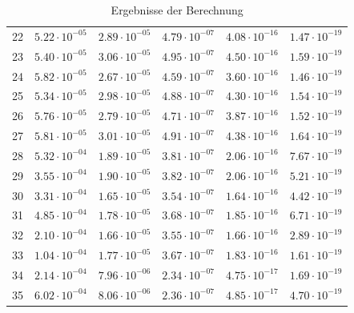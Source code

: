 \begin{table}[h]
\begin{tabular}{llllll}
		22 &$\mathrm{5.22 \cdot 10^{-05}}$ & $\mathrm{2.89 \cdot 10^{-05}}$ & $\mathrm{4.79 \cdot 10^{-07}}$ & $\mathrm{4.08 \cdot 10^{-16}}$ & $\mathrm{1.47 \cdot 10^{-19}}$ \\
		23 &$\mathrm{5.40 \cdot 10^{-05}}$ & $\mathrm{3.06 \cdot 10^{-05}}$ & $\mathrm{4.95 \cdot 10^{-07}}$ & $\mathrm{4.50 \cdot 10^{-16}}$ & $\mathrm{1.59 \cdot 10^{-19}}$ \\
		24 &$\mathrm{5.82 \cdot 10^{-05}}$ & $\mathrm{2.67 \cdot 10^{-05}}$ & $\mathrm{4.59 \cdot 10^{-07}}$ & $\mathrm{3.60 \cdot 10^{-16}}$ & $\mathrm{1.46 \cdot 10^{-19}}$ \\
		25 &$\mathrm{5.34 \cdot 10^{-05}}$ & $\mathrm{2.98 \cdot 10^{-05}}$ & $\mathrm{4.88 \cdot 10^{-07}}$ & $\mathrm{4.30 \cdot 10^{-16}}$ & $\mathrm{1.54 \cdot 10^{-19}}$ \\
		26 &$\mathrm{5.76 \cdot 10^{-05}}$ & $\mathrm{2.79 \cdot 10^{-05}}$ & $\mathrm{4.71 \cdot 10^{-07}}$ & $\mathrm{3.87 \cdot 10^{-16}}$ & $\mathrm{1.52 \cdot 10^{-19}}$ \\
		27 &$\mathrm{5.81 \cdot 10^{-05}}$ & $\mathrm{3.01 \cdot 10^{-05}}$ & $\mathrm{4.91 \cdot 10^{-07}}$ & $\mathrm{4.38 \cdot 10^{-16}}$ & $\mathrm{1.64 \cdot 10^{-19}}$ \\
		28 &$\mathrm{5.32 \cdot 10^{-04}}$ & $\mathrm{1.89 \cdot 10^{-05}}$ & $\mathrm{3.81 \cdot 10^{-07}}$ & $\mathrm{2.06 \cdot 10^{-16}}$ & $\mathrm{7.67 \cdot 10^{-19}}$ \\
		29 &$\mathrm{3.55 \cdot 10^{-04}}$ & $\mathrm{1.90 \cdot 10^{-05}}$ & $\mathrm{3.82 \cdot 10^{-07}}$ & $\mathrm{2.06 \cdot 10^{-16}}$ & $\mathrm{5.21 \cdot 10^{-19}}$ \\
		30 &$\mathrm{3.31 \cdot 10^{-04}}$ & $\mathrm{1.65 \cdot 10^{-05}}$ & $\mathrm{3.54 \cdot 10^{-07}}$ & $\mathrm{1.64 \cdot 10^{-16}}$ & $\mathrm{4.42 \cdot 10^{-19}}$ \\
		31 &$\mathrm{4.85 \cdot 10^{-04}}$ & $\mathrm{1.78 \cdot 10^{-05}}$ & $\mathrm{3.68 \cdot 10^{-07}}$ & $\mathrm{1.85 \cdot 10^{-16}}$ & $\mathrm{6.71 \cdot 10^{-19}}$ \\
		32 &$\mathrm{2.10 \cdot 10^{-04}}$ & $\mathrm{1.66 \cdot 10^{-05}}$ & $\mathrm{3.55 \cdot 10^{-07}}$ & $\mathrm{1.66 \cdot 10^{-16}}$ & $\mathrm{2.89 \cdot 10^{-19}}$ \\
		33 &$\mathrm{1.04 \cdot 10^{-04}}$ & $\mathrm{1.77 \cdot 10^{-05}}$ & $\mathrm{3.67 \cdot 10^{-07}}$ & $\mathrm{1.83 \cdot 10^{-16}}$ & $\mathrm{1.61 \cdot 10^{-19}}$ \\
		34 &$\mathrm{2.14 \cdot 10^{-04}}$ & $\mathrm{7.96 \cdot 10^{-06}}$ & $\mathrm{2.34 \cdot 10^{-07}}$ & $\mathrm{4.75 \cdot 10^{-17}}$ & $\mathrm{1.69 \cdot 10^{-19}}$ \\
		35 &$\mathrm{6.02 \cdot 10^{-04}}$ & $\mathrm{8.06 \cdot 10^{-06}}$ & $\mathrm{2.36 \cdot 10^{-07}}$ & $\mathrm{4.85 \cdot 10^{-17}}$ & $\mathrm{4.70 \cdot 10^{-19}}$ \\
		\bottomrule
	\end{tabular}
	\caption{Ergebnisse der Berechnung}
	\label{tab:ergebnisse}
\end{table}
%

